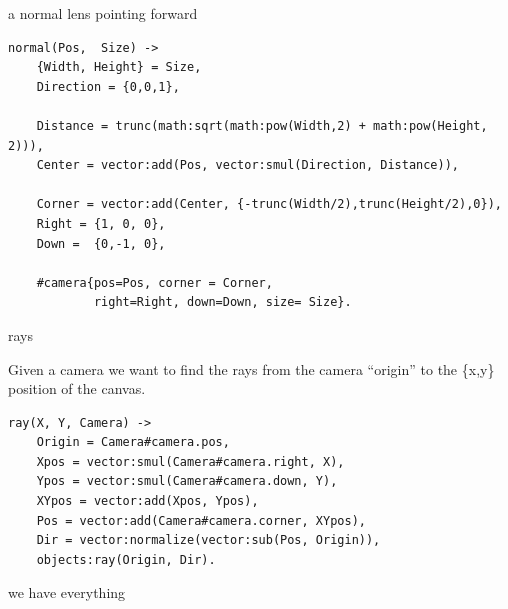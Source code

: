 \begin{frame}[fragile]{a normal lens pointing forward}

\begin{verbatim}
normal(Pos,  Size) ->
    {Width, Height} = Size,
    Direction = {0,0,1}, 

    Distance = trunc(math:sqrt(math:pow(Width,2) + math:pow(Height, 2))),
    Center = vector:add(Pos, vector:smul(Direction, Distance)),

    Corner = vector:add(Center, {-trunc(Width/2),trunc(Height/2),0}), 
    Right = {1, 0, 0},
    Down =  {0,-1, 0},

    #camera{pos=Pos, corner = Corner, 
            right=Right, down=Down, size= Size}.

\end{verbatim}

\end{frame}


\begin{frame}[fragile]{rays}

Given a camera we want to find the rays from the camera ``origin'' to
the \{x,y\} position of the canvas.

\pause

\begin{verbatim}
ray(X, Y, Camera) ->
    Origin = Camera#camera.pos,
    Xpos = vector:smul(Camera#camera.right, X),
    Ypos = vector:smul(Camera#camera.down, Y),
    XYpos = vector:add(Xpos, Ypos),
    Pos = vector:add(Camera#camera.corner, XYpos),
    Dir = vector:normalize(vector:sub(Pos, Origin)),
    objects:ray(Origin, Dir).
\end{verbatim}

\end{frame}


\begin{frame}{we have everything}

\begin{figure}
\end{figure}

\end{frame}


